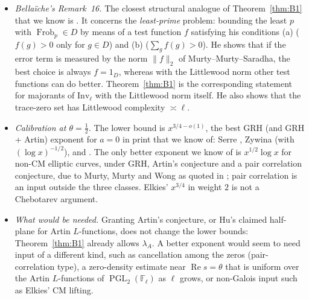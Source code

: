 \documentclass[11pt]{amsart}
\theoremstyle{definition}
\theoremstyle{remark}
\newcommand{\F}{\mathbb{F}}
\DeclareMathOperator{\PGL}{PGL}
\DeclareMathOperator{\Frob}{Frob}
\newcommand{\Inv}{\mathrm{Inv}}
\newcommand{\Zt}{\mathrm{Z}}       %
\begin{document}
\begin{itemize}[leftmargin=*]
{  the citation of the published paper, e.g.\ \cite[(6)]{CW}, which refers to ``[Be16, Corollaire 17, p.~51]'', the
  numbering and page of arXiv v1.} The corrected \cite[Thm.~14]{Bel16} has exponent
  $(\alpha+4\beta+1)/(2\alpha+4\beta+2)$, where $|G_\ell|/|D_\ell|\sim\ell^\alpha$ and
  $\lambda_A(D_\ell)\ll\ell^\beta$. For $D_\ell=\Inv_\ell$ we have $\alpha=\beta=1$, since
  $|\Inv_\ell|/|G_\ell|=\ell/(\ell^2-1)$ and $\lambda_A(1_{\Inv})=(\ell^2+1)/(\ell+1)$. This gives $3/4$. With
  $x^{1/2}$ replaced by $x^\theta$ the same proof gives $1-(1+\alpha)(1-\theta)/(1+\alpha+2\beta)=(1+\theta)/2$, in
  line with \cite[Rem.~18(iv)]{Bel16}: at $\alpha=1$ the sieve and the single-$\ell$ method tie. The reason is that
  each sieving prime divides the main term by $\asymp\ell$ and multiplies each off-diagonal error by $\asymp\ell$. The
  sieve can also be run without Artin's conjecture, using induced (Hecke) test functions, whose norm
  $\lambda_{\mathrm{mon}}$ is submultiplicative; this needs only $\Zt(\theta)$ for the composita, and again gives
  $(1+\theta)/2$. By Proposition~\ref{prop:sieve}, no choice of support or weights in Bella\"iche's sieve, with or
  without Artin's conjecture, does better.
\item \emph{Bella\"iche's Remark~16.} The closest structural analogue of Theorem~\ref{thm:B1} that we know is
  \cite[Rem.~16]{Bel16}. It concerns the \emph{least-prime} problem: bounding the least $p$ with $\Frob_p\in D$ by means
  of a test function $f$ satisfying his conditions (a) ($f(g)>0$ only for $g\in D$) and (b) ($\sum_gf(g)>0$). He
  shows that if the error term is measured by the norm $\|f\|_2$ of Murty--Murty--Saradha, the best choice is
  always $f=1_D$, whereas with the Littlewood norm other test functions can do better. Theorem~\ref{thm:B1} is the
  corresponding statement for majorants of $\Inv_\ell$ with the Littlewood norm itself. He also shows
  \cite[Thm.~11]{Bel16} that the trace-zero set has Littlewood complexity $\asymp\ell$.
\item \emph{Calibration at $\theta=\frac12$.} The lower bound is $x^{3/4-o(1)}$, the best GRH (and GRH + Artin)
  exponent for $a=0$ in print that we know of: Serre \cite{Serre81}, Zywina \cite{Zyw15} (with $(\log x)^{-1/2}$), and
  \cite[Cor.~15]{Bel16}. The only better exponent we know of is $x^{1/2}\log x$ for non-CM elliptic curves, under GRH,
  Artin's conjecture and a pair correlation conjecture, due to Murty, Murty and Wong as quoted in \cite[(7)]{CW}; pair
  correlation is an input outside the three classes. Elkies' $x^{3/4}$ in weight $2$ is not a Chebotarev argument.
\item \emph{What would be needed.} Granting Artin's conjecture, or Hu's claimed half-plane for Artin $L$-functions,
  does not change the lower bounds: Theorem~\ref{thm:B1} already allows $\lambda_A$. A better exponent would seem to
  need input of a different kind, such as cancellation among the zeros (pair-correlation type), a zero-density
  estimate near $\operatorname{Re}s=\theta$ that is uniform over the Artin $L$-functions of $\PGL_2(\F_\ell)$ as $\ell$
  grows, or non-Galois input such as Elkies' CM lifting.
\end{itemize}
\end{document}

